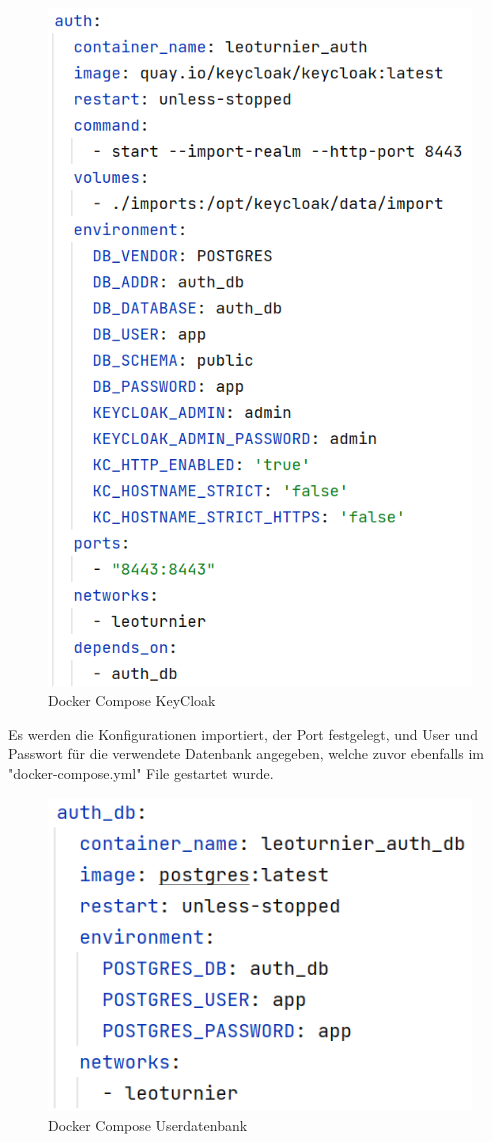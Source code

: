 \begin{figure}[H]
    \includegraphics[scale=0.4]{pics/docker/docker-compose_auth.png}
    \caption{Docker Compose KeyCloak}
\end{figure}

Es werden die Konfigurationen importiert, der Port festgelegt, und User und Passwort für die verwendete Datenbank angegeben, welche zuvor ebenfalls im "docker-compose.yml" File gestartet wurde.

\begin{figure}[H]
    \includegraphics[scale=0.4]{pics/docker/docker-compose_auth_db.png}
    \caption{Docker Compose Userdatenbank}
\end{figure}